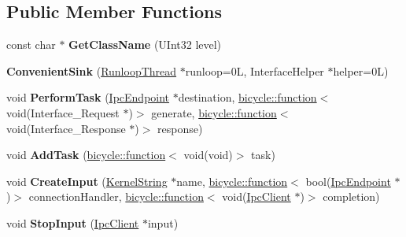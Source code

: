 \subsection*{Public Member Functions}
\begin{DoxyCompactItemize}
\item 
\mbox{\label{class_convenient_sink_a5de85f0a250db250ec8dbc13a8a4df1f}} 
const char $\ast$ {\bfseries Get\+Class\+Name} (U\+Int32 level)
\item 
\mbox{\label{class_convenient_sink_ad002c843d001c4e20b88be15326e94cf}} 
{\bfseries Convenient\+Sink} (\hyperlink{class_runloop_thread}{Runloop\+Thread} $\ast$runloop=0\+L, Interface\+Helper $\ast$helper=0\+L)
\item 
\mbox{\label{class_convenient_sink_a2d71d1a552fba23e7c9f9b02c314c703}} 
void {\bfseries Perform\+Task} (\hyperlink{class_ipc_endpoint}{Ipc\+Endpoint} $\ast$destination, \hyperlink{classbicycle_1_1function}{bicycle\+::function}$<$ void(Interface\+\_\+\+Request $\ast$)$>$ generate, \hyperlink{classbicycle_1_1function}{bicycle\+::function}$<$ void(Interface\+\_\+\+Response $\ast$)$>$ response)
\item 
\mbox{\label{class_convenient_sink_a7a28863f9fd4f0cacec0bffc81e63a3b}} 
void {\bfseries Add\+Task} (\hyperlink{classbicycle_1_1function}{bicycle\+::function}$<$ void(void)$>$ task)
\item 
\mbox{\label{class_convenient_sink_ae1907e7769945ff19fdd27c2cedeed25}} 
void {\bfseries Create\+Input} (\hyperlink{class_kernel_string}{Kernel\+String} $\ast$name, \hyperlink{classbicycle_1_1function}{bicycle\+::function}$<$ bool(\hyperlink{class_ipc_endpoint}{Ipc\+Endpoint} $\ast$)$>$ connection\+Handler, \hyperlink{classbicycle_1_1function}{bicycle\+::function}$<$ void(\hyperlink{class_ipc_client}{Ipc\+Client} $\ast$)$>$ completion)
\item 
\mbox{\label{class_convenient_sink_a00f0767e8ace4bba9dcf74684e33c4dc}} 
void {\bfseries Stop\+Input} (\hyperlink{class_ipc_client}{Ipc\+Client} $\ast$input)
\item 
\mbox{\label{class_convenient_sink_a81225ccdf46f074f43591f893e597076}} 

\end{DoxyCompactItemize}
